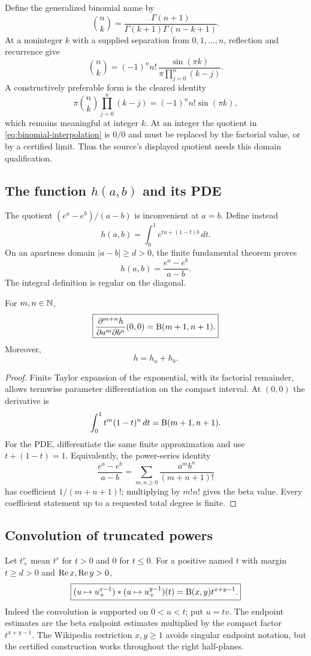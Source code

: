 Define the generalized binomial name by
\[
 \binom nk=\frac{\Gamma(n+1)}{\Gamma(k+1)\Gamma(n-k+1)}.
\]
At a noninteger $k$ with a supplied separation from $0,1,\dots,n$, reflection and recurrence give
\begin{equation}
 \boxed{
 \binom nk=(-1)^n n!\,
 \frac{\sin(\pi k)}{\pi\prod_{j=0}^n(k-j)}.}
 \label{eq:binomial-interpolation}
\end{equation}
A constructively preferable form is the cleared identity
\[
 \pi\binom nk\prod_{j=0}^n(k-j)=(-1)^n n!\sin(\pi k),
\]
which remains meaningful at integer $k$.  At an integer the quotient in \eqref{eq:binomial-interpolation} is $0/0$ and must be replaced by the factorial value, or by a certified limit.  Thus the source's displayed quotient needs this domain qualification.

\subsection{The function $h(a,b)$ and its PDE}

The quotient $(e^a-e^b)/(a-b)$ is inconvenient at $a=b$.  Define instead
\[
 h(a,b)=\int_0^1 e^{ta+(1-t)b}\,dt.
\]
On an apartness domain $|a-b|\ge d>0$, the finite fundamental theorem proves
\[
 h(a,b)=\frac{e^a-e^b}{a-b}.
\]
The integral definition is regular on the diagonal.

\begin{theorem}\label{thm:h-derivatives}
For $m,n\in\mathbb N$,
\[
 \boxed{
 \frac{\partial^{m+n}h}{\partial a^m\partial b^n}(0,0)
 =\mathrm B(m+1,n+1).}
\]
Moreover,
\[
 \boxed{h=h_a+h_b.}
\]
\end{theorem}

\begin{proof}
Finite Taylor expansion of the exponential, with its factorial remainder, allows termwise parameter differentiation on the compact interval.  At $(0,0)$ the derivative is
\[
 \int_0^1 t^m(1-t)^n\,dt=\mathrm B(m+1,n+1).
\]
For the PDE, differentiate the same finite approximation and use $t+(1-t)=1$.  Equivalently, the power-series identity
\[
 \frac{e^a-e^b}{a-b}
 =\sum_{m,n\ge0}\frac{a^m b^n}{(m+n+1)!}
\]
has coefficient $1/(m+n+1)!$; multiplying by $m!n!$ gives the beta value.  Every coefficient statement up to a requested total degree is finite.
\end{proof}

\subsection{Convolution of truncated powers}

Let $t_+^r$ mean $t^r$ for $t>0$ and $0$ for $t\le0$.  For a positive named $t$ with margin $t\ge d>0$ and $\operatorname{Re} x,\operatorname{Re} y>0$,
\begin{equation}
 \boxed{
 (u\mapsto u_+^{x-1})*(u\mapsto u_+^{y-1})(t)
 =\mathrm B(x,y)t^{x+y-1}.}
 \label{eq:convolution}
\end{equation}
Indeed the convolution is supported on $0<u<t$; put $u=tv$.  The endpoint estimates are the beta endpoint estimates multiplied by the compact factor $t^{x+y-1}$.  The Wikipedia restriction $x,y\ge1$ avoids singular endpoint notation, but the certified construction works throughout the right half-planes.
